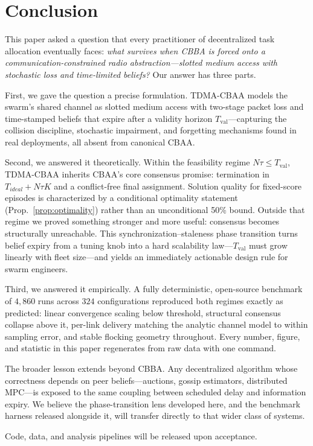 \section{Conclusion}\label{sec:conclusion}

This paper asked a question that every practitioner of decentralized task allocation eventually faces: \emph{what survives when CBBA is forced onto a communication-constrained radio abstraction---slotted medium access with stochastic loss and time-limited beliefs?}
Our answer has three parts.

First, we gave the question a precise formulation.
TDMA-CBAA models the swarm's shared channel as slotted medium access with two-stage packet loss and time-stamped beliefs that expire after a validity horizon $T_{\mathrm{val}}$---capturing the collision discipline, stochastic impairment, and forgetting mechanisms found in real deployments, all absent from canonical CBAA.

Second, we answered it theoretically.
Within the feasibility regime $N\tau \leq T_{\mathrm{val}}$, TDMA-CBAA inherits CBAA's core consensus promise: termination in $T_{ideal} + N\tau K$ and a conflict-free final assignment. Solution quality for fixed-score episodes is characterized by a conditional optimality statement (Prop.~\ref{prop:optimality}) rather than an unconditional 50\% bound.
Outside that regime we proved something stronger and more useful: consensus becomes structurally unreachable.
This synchronization--staleness phase transition turns belief expiry from a tuning knob into a hard scalability law---$T_{\mathrm{val}}$ must grow linearly with fleet size---and yields an immediately actionable design rule for swarm engineers.

Third, we answered it empirically.
A fully deterministic, open-source benchmark of $4{,}860$ runs across $324$ configurations reproduced both regimes exactly as predicted: linear convergence scaling below threshold, structural consensus collapse above it, per-link delivery matching the analytic channel model to within sampling error, and stable flocking geometry throughout.
Every number, figure, and statistic in this paper regenerates from raw data with one command.

The broader lesson extends beyond CBBA.
Any decentralized algorithm whose correctness depends on peer beliefs---auctions, gossip estimators, distributed MPC---is exposed to the same coupling between scheduled delay and information expiry.
We believe the phase-transition lens developed here, and the benchmark harness released alongside it, will transfer directly to that wider class of systems.

Code, data, and analysis pipelines will be released upon acceptance.